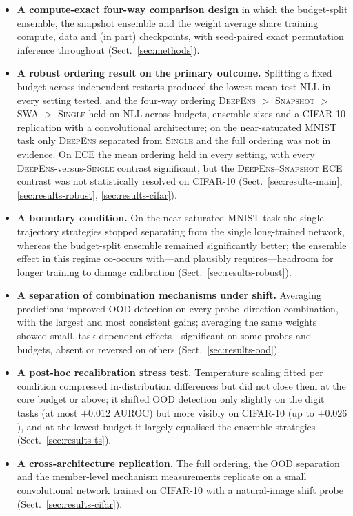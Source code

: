 \documentclass[11pt,a4paper]{article}
\newcommand{\deepens}{\textsc{DeepEns}}
\newcommand{\snapshot}{\textsc{Snapshot}}
\newcommand{\swa}{\textsc{SWA}}
\newcommand{\single}{\textsc{Single}}
\begin{document}
\begin{itemize}[leftmargin=1.4em,itemsep=1.5pt,topsep=2pt]
\item \textbf{A compute-exact four-way comparison design} in which the
budget-split ensemble, the snapshot ensemble and the weight average share
training compute, data and (in part) checkpoints, with seed-paired exact
permutation inference throughout (Sect.~\ref{sec:methods}).
\item \textbf{A robust ordering result on the primary outcome.} Splitting
a fixed budget across independent restarts produced the lowest mean test
NLL in every setting tested, and the four-way ordering \deepens{} $>$
\snapshot{} $>$ \swa{} $>$ \single{} held on NLL across budgets, ensemble
sizes and a CIFAR-10 replication with a convolutional architecture; on the
near-saturated MNIST task only \deepens{} separated from \single{} and the
full ordering was not in evidence. On ECE the mean ordering held in every
setting, with every \deepens{}-versus-\single{} contrast significant, but
the \deepens{}--\snapshot{} ECE contrast was not statistically resolved on
CIFAR-10 (Sect.~\ref{sec:results-main}, \ref{sec:results-robust},
\ref{sec:results-cifar}).
\item \textbf{A boundary condition.} On the near-saturated MNIST task the
single-trajectory strategies stopped separating from the single long-trained
network, whereas the budget-split ensemble remained significantly better;
the ensemble effect in this regime co-occurs with---and plausibly
requires---headroom for longer training to damage calibration
(Sect.~\ref{sec:results-robust}).
\item \textbf{A separation of combination mechanisms under shift.} Averaging
predictions improved OOD detection on every probe--direction combination,
with the largest and most consistent gains; averaging the same weights
showed small, task-dependent effects---significant on some probes and
budgets, absent or reversed on others
(Sect.~\ref{sec:results-ood}).
\item \textbf{A post-hoc recalibration stress test.} Temperature scaling
fitted per condition compressed in-distribution differences but did not
close them at the core budget or above; it shifted OOD detection only
slightly on the digit tasks (at most $+0.012$ AUROC) but more visibly on
CIFAR-10 (up to $+0.026$), and at the lowest budget it largely equalised
the ensemble strategies (Sect.~\ref{sec:results-ts}).
\item \textbf{A cross-architecture replication.} The full ordering, the
OOD separation and the member-level mechanism measurements replicate on a
small convolutional network trained on CIFAR-10 with a natural-image shift
probe (Sect.~\ref{sec:results-cifar}).
\end{itemize}
\end{document}
